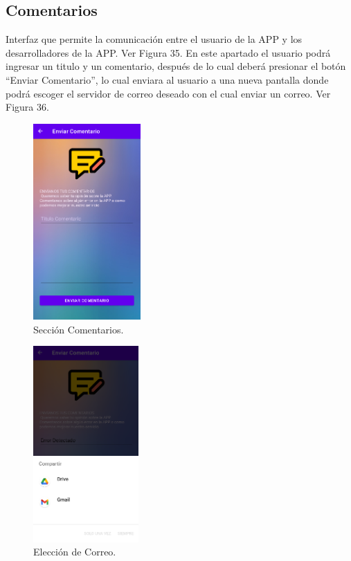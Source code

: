 \documentclass[a4paper,10pt, oneside, titlepage]{article}
\begin{document}
	\subsection{Comentarios}
	Interfaz que permite la comunicación entre el usuario de la APP y los desarrolladores de la APP. Ver Figura 35. En este apartado el usuario podrá ingresar un titulo y un comentario, después de lo cual deberá presionar el botón ``Enviar Comentario'', lo cual enviara al usuario a una nueva pantalla donde podrá escoger el servidor de correo deseado con el cual enviar un correo. Ver Figura 36.
	\begin{figure}[!ht]
		\centering
		\includegraphics[width = 0.4\linewidth, height = 7.5cm]{35.png}
		\caption{Sección Comentarios.}
	\end{figure}
	\begin{figure}[!ht]
		\centering
		\includegraphics[width = 0.4\linewidth, height = 7.5cm]{36.png}
		\caption{Elección de Correo.}
	\end{figure}
	
\end{document}

